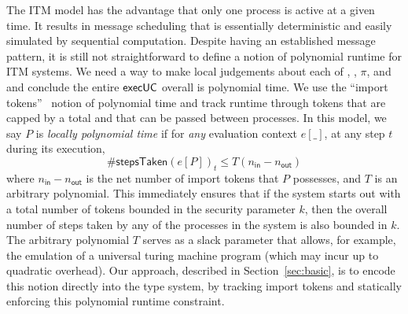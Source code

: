 The ITM model has the advantage that only one process is active at a given time. It results in message scheduling that is essentially deterministic and easily simulated by sequential computation. 
Despite having an established message pattern, it is still not straightforward to define a notion of polynomial runtime for ITM systems.
We need a way to make local judgements about each of \A, \Z, $\pi$, and \F and conclude the entire ${\mathsf {execUC}}$ overall is polynomial time. 
We use the ``import tokens''~\cite{canettiUC} notion of polynomial time and track runtime through tokens that are capped by a total and that can be passed between processes. 
In this model, we say $P$ is \emph{locally polynomial time} if for \emph{any} evaluation context $e[\_]$, at any step $t$ during its execution,
\[
\#\textsf{stepsTaken}(e[P])_{t} \le T(n_{\textsf{in}} - n_{\textsf{out}})
\]
where $n_{\textsf{in}} - n_{\textsf{out}}$ is the net number of import tokens that $P$ possesses, and $T$ is an arbitrary polynomial.
This immediately ensures that if the system starts out with a total number of tokens bounded in the security parameter $k$, then the overall number of steps taken by any of the processes in the system is also bounded in $k$.
The arbitrary polynomial $T$ serves as a slack parameter that allows, for example, the emulation of a universal turing machine program (which may incur up to quadratic overhead).
Our approach, described in Section~\ref{sec:basic}, is to encode this notion directly into the type system, by tracking import tokens and statically enforcing this polynomial runtime constraint.

